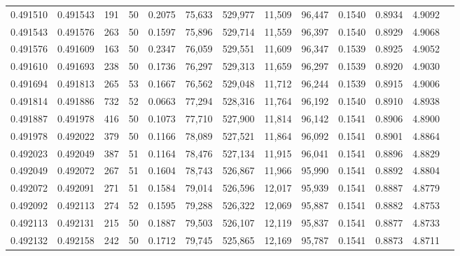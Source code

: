 \begin{tabular}{rrrrrrrrrrrrr}
0.491510 & 0.491543 & 191 &  50 &                                     0.2075 &  75,633 & 529,977 &  11,509 &  96,447 & 0.1540 & 0.8934 & 4.9092 \\
0.491543 & 0.491576 & 263 &  50 &                                     0.1597 &  75,896 & 529,714 &  11,559 &  96,397 & 0.1540 & 0.8929 & 4.9068 \\
0.491576 & 0.491609 & 163 &  50 &                                     0.2347 &  76,059 & 529,551 &  11,609 &  96,347 & 0.1539 & 0.8925 & 4.9052 \\
0.491610 & 0.491693 & 238 &  50 &                                     0.1736 &  76,297 & 529,313 &  11,659 &  96,297 & 0.1539 & 0.8920 & 4.9030 \\
0.491694 & 0.491813 & 265 &  53 &                                     0.1667 &  76,562 & 529,048 &  11,712 &  96,244 & 0.1539 & 0.8915 & 4.9006 \\
0.491814 & 0.491886 & 732 &  52 &                                     0.0663 &  77,294 & 528,316 &  11,764 &  96,192 & 0.1540 & 0.8910 & 4.8938 \\
0.491887 & 0.491978 & 416 &  50 &                                     0.1073 &  77,710 & 527,900 &  11,814 &  96,142 & 0.1541 & 0.8906 & 4.8900 \\
0.491978 & 0.492022 & 379 &  50 &                                     0.1166 &  78,089 & 527,521 &  11,864 &  96,092 & 0.1541 & 0.8901 & 4.8864 \\
0.492023 & 0.492049 & 387 &  51 &                                     0.1164 &  78,476 & 527,134 &  11,915 &  96,041 & 0.1541 & 0.8896 & 4.8829 \\
0.492049 & 0.492072 & 267 &  51 &                                     0.1604 &  78,743 & 526,867 &  11,966 &  95,990 & 0.1541 & 0.8892 & 4.8804 \\
0.492072 & 0.492091 & 271 &  51 &                                     0.1584 &  79,014 & 526,596 &  12,017 &  95,939 & 0.1541 & 0.8887 & 4.8779 \\
0.492092 & 0.492113 & 274 &  52 &                                     0.1595 &  79,288 & 526,322 &  12,069 &  95,887 & 0.1541 & 0.8882 & 4.8753 \\
0.492113 & 0.492131 & 215 &  50 &                                     0.1887 &  79,503 & 526,107 &  12,119 &  95,837 & 0.1541 & 0.8877 & 4.8733 \\
0.492132 & 0.492158 & 242 &  50 &                                     0.1712 &  79,745 & 525,865 &  12,169 &  95,787 & 0.1541 & 0.8873 & 4.8711 \\

\end{tabular}
